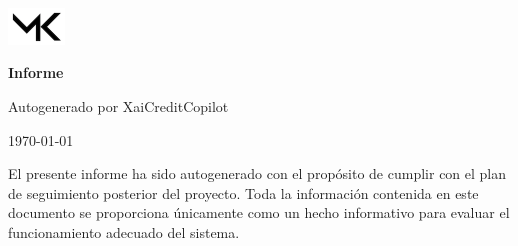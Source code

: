 \documentclass{article}
\begin{document}
\begin{flushright} %
    \includegraphics[width=1.5cm]{tex/media/logo.png} 
\end{flushright}

\centering
{\Huge \textbf{Informe}}

\vspace{0.5cm}

{\Large Autogenerado por XaiCreditCopilot}

\vspace{0.5cm}

{\large \today}

\raggedright

El presente informe ha sido autogenerado con el propósito de cumplir con el plan de seguimiento posterior del proyecto. Toda la información contenida en este documento se proporciona únicamente como un hecho informativo para evaluar el funcionamiento adecuado del sistema.
\end{document}
